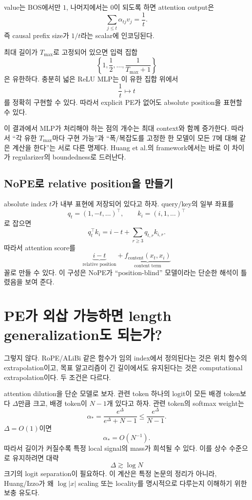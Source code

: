 \documentclass[11pt,a4paper,oneside,openany]{memoir}
\theoremstyle{definition}
\begin{document}
value는 BOS에서만 $1$, 나머지에서는 $0$이 되도록 하면 attention output은
\[
\sum_{j\le t}\alpha_{tj}v_j
=\frac1t.
\]
즉 causal prefix size가 $1/t$라는 scalar에 인코딩된다.

최대 길이가 $T_{\max}$로 고정되어 있으면 입력 집합
\[
\left\{1,\frac12,\ldots,\frac1{T_{\max}+1}\right\}
\]
은 유한하다. 충분히 넓은 ReLU MLP는 이 유한 집합 위에서
\[
\frac1t\mapsto t
\]
를 정확히 구현할 수 있다. 따라서 explicit PE가 없어도 absolute position을 표현할 수 있다.

\begin{warningbox}
이 결과에서 MLP가 처리해야 하는 점의 개수는 최대 context와 함께 증가한다.
따라서 ``각 유한 $T_{\max}$마다 구현 가능''과 ``폭/복잡도를 고정한 한 모델이 모든 $T$에 대해 같은 계산을 한다''는 서로 다른 명제다.
Huang et al.의 framework에서는 바로 이 차이가 regularizer의 boundedness로 드러난다.
\end{warningbox}

\subsection{NoPE로 relative position을 만들기}

absolute index $t$가 내부 표현에 저장되어 있다고 하자. query/key의 일부 좌표를
\[
q_t=(1,-t,\ldots)^\top,
\qquad
k_i=(i,1,\ldots)^\top
\]
로 잡으면
\[
q_t^\top k_i
=i-t+\sum_{r\ge3}q_{t,r}k_{i,r}.
\]
따라서 attention score를
\[
\underbrace{i-t}_{\text{relative position}}
+
\underbrace{f_{\mathrm{content}}(x_t,x_i)}_{\text{content term}}
\]
꼴로 만들 수 있다. 이 구성은 NoPE가 ``position-blind'' 모델이라는 단순한 해석이 틀렸음을 보여 준다.

\section{PE가 외삽 가능하면 length generalization도 되는가?}

그렇지 않다. RoPE/ALiBi 같은 함수가 임의 index에서 정의된다는 것은 위치 함수의 extrapolation이고,
목표 알고리즘이 긴 길이에서도 유지된다는 것은 computational extrapolation이다.
두 조건은 다르다.

\begin{suppbox}
attention dilution을 단순 모델로 보자. 관련 token 하나의 logit이 모든 배경 token보다 $\Delta$만큼 크고,
배경 token이 $N-1$개 있다고 하자. 관련 token의 softmax weight는
\[
\alpha_*
=\frac{e^{\Delta}}{e^{\Delta}+N-1}
\le \frac{e^{\Delta}}{N-1}.
\]
$\Delta=O(1)$이면
\[
\alpha_*=O(N^{-1}).
\]
따라서 길이가 커질수록 특정 local signal의 mass가 희석될 수 있다. 이를 상수 수준으로 유지하려면 대략
\[
\Delta\gtrsim \log N
\]
크기의 logit separation이 필요하다. 이 계산은 특정 논문의 정리가 아니라, Huang/Izzo가 왜 $\log |x|$ scaling 또는 locality를 명시적으로 다루는지 이해하기 위한 보충 유도다.
\end{suppbox}
\end{document}
